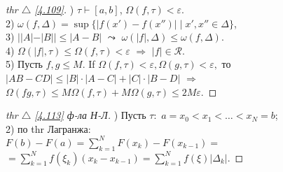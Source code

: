
\begin{minipage}[t]{0.45\textwidth}
\begin{proof}[
thr $\triangle$
\eqref{4.109}]

\phantom{42}

) $\tau \vdash [a, b]$, $\Omega(f, \tau) < \varepsilon$. \\
2) $\omega(f, \Delta) = \sup\{|f(x')-f(x'')| \mid x', x'' \in \Delta\}$, \\
3) $||A|-|B|| \leq |A-B|$ $\leadsto$ $\omega(|f|, \Delta) \leq \omega(f, \Delta)$. \\
4) $\Omega(|f|, \tau) \leq \Omega(f, \tau) < \varepsilon$ $\Rightarrow$ $|f| \in \mathcal{R}$.\\
5) Пусть $f, g \leq M$. If $\Omega(f, \tau) < \varepsilon, \Omega(g, \tau) < \varepsilon,$ то $|AB-CD|\leq|B| \cdot |A-C| + |C| \cdot |B-D|$ $\Rightarrow$ $\Omega(fg, \tau) \leq M \Omega(f, \tau) + M \Omega(g, \tau) \leq 2M \varepsilon$.
\end{proof}

\begin{proof}[
thr $\triangle$
\eqref{4.113} ф-ла Н-Л]

\phantom{42}

) Пусть $\tau:$ $a=x_0 < x_1 < \ldots < x_N = b$; \\
2) по thr Лагранжа: \\
$F(b) - F(a) = \sum_{k=1}^N F(x_{k}) - F(x_{k-1})=$\\
$= \sum_{k=1}^N f(\xi_k) (x_k - x_{k-1}) = \sum_{k=1}^N f(\xi) |\Delta_k|$.
\end{proof}
\end{minipage}
\hfill
